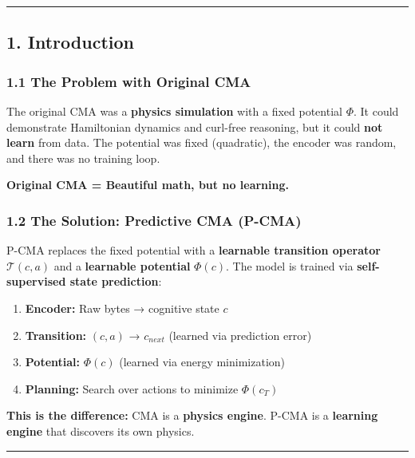 \documentclass[
  11pt,
  a4paper,
]{article}
\providecommand{\tightlist}{%
  \setlength{\itemsep}{0pt}\setlength{\parskip}{0pt}}
\begin{document}
\begin{center}\rule{0.5\linewidth}{0.5pt}\end{center}

\subsection{1. Introduction}\label{introduction}

\subsubsection{1.1 The Problem with Original
CMA}\label{the-problem-with-original-cma}

The original CMA was a \textbf{physics simulation} with a fixed
potential \(\Phi\). It could demonstrate Hamiltonian dynamics and
curl-free reasoning, but it could \textbf{not learn} from data. The
potential was fixed (quadratic), the encoder was random, and there was
no training loop.

\textbf{Original CMA = Beautiful math, but no learning.}

\subsubsection{1.2 The Solution: Predictive CMA
(P-CMA)}\label{the-solution-predictive-cma-p-cma}

P-CMA replaces the fixed potential with a \textbf{learnable transition
operator} \(\mathcal{T}(c, a)\) and a \textbf{learnable potential}
\(\Phi(c)\). The model is trained via \textbf{self-supervised state
prediction}:

\begin{enumerate}
\def\labelenumi{\arabic{enumi}.}
\tightlist
\item
  \textbf{Encoder:} Raw bytes → cognitive state \(c\)
\item
  \textbf{Transition:} \((c, a)\) → \(c_{next}\) (learned via prediction
  error)
\item
  \textbf{Potential:} \(\Phi(c)\) (learned via energy minimization)
\item
  \textbf{Planning:} Search over actions to minimize \(\Phi(c_T)\)
\end{enumerate}

\textbf{This is the difference:} CMA is a \textbf{physics engine}. P-CMA
is a \textbf{learning engine} that discovers its own physics.

\begin{center}\rule{0.5\linewidth}{0.5pt}\end{center}
\end{document}
